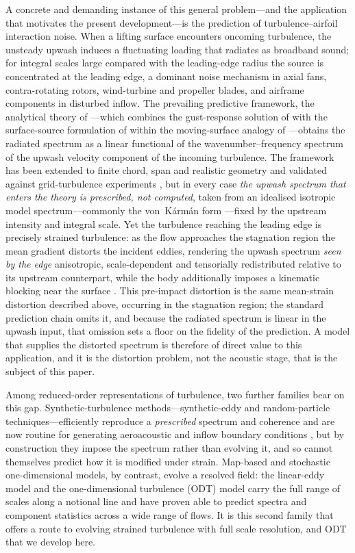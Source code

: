 \documentclass[lineno]{JFM-FLM_Au}
\begin{document}
A concrete and demanding instance of this general problem---and the application
that motivates the present development---is the prediction of
turbulence--airfoil interaction noise. When a lifting surface encounters
oncoming turbulence, the unsteady upwash induces a fluctuating loading that
radiates as broadband sound; for integral scales large compared with the
leading-edge radius the source is concentrated at the leading edge, a dominant
noise mechanism in axial fans, contra-rotating rotors, wind-turbine and
propeller blades, and airframe components in disturbed inflow. The prevailing
predictive framework, the analytical theory of \citet{Amiet1975}---which
combines the gust-response solution of \citet{Sears1941} with the
surface-source formulation of \citet{Curle1955} within the moving-surface
analogy of \citet{FfowcsWilliams1969}---obtains the radiated spectrum as a
linear functional of the wavenumber--frequency spectrum of the upwash velocity
component of the incoming turbulence. The framework has been extended to finite
chord, span and realistic geometry and validated against grid-turbulence
experiments \citep{PatersonAmiet1977,RogerMoreau2010}, but in every case
\emph{the upwash spectrum that enters the theory is prescribed, not computed},
taken from an idealised isotropic model spectrum---commonly the
von~K\'arm\'an form \citep{vonKarman1948}---fixed by the upstream intensity and
integral scale. Yet the turbulence reaching the leading edge is precisely
strained turbulence: as the flow approaches the stagnation region the mean
gradient distorts the incident eddies, rendering the upwash spectrum
\emph{seen by the edge} anisotropic, scale-dependent and tensorially
redistributed relative to its upstream counterpart, while the body additionally
imposes a kinematic blocking near the surface \citep{HuntGraham1978}. This
pre-impact distortion is the same mean-strain distortion described above,
occurring in the stagnation region; the standard prediction chain omits it,
and because the radiated spectrum is linear in the upwash input, that omission
sets a floor on the fidelity of the prediction. A model that supplies the
distorted spectrum is therefore of direct value to this application, and it is
the distortion problem, not the acoustic stage, that is the subject of this
paper.

Among reduced-order representations of turbulence, two further families bear on
this gap. Synthetic-turbulence methods---synthetic-eddy and random-particle
techniques---efficiently reproduce a \emph{prescribed} spectrum and coherence
and are now routine for generating aeroacoustic and inflow boundary conditions
\citep{KimHaeri2015}, but by construction they impose the spectrum rather than
evolving it, and so cannot themselves predict how it is modified under strain.
Map-based and stochastic one-dimensional models, by contrast, evolve a
resolved field: the linear-eddy model \citep{Kerstein1991} and the
one-dimensional turbulence (ODT) model \citep{Kerstein1999} carry the full range
of scales along a notional line and have proven able to predict spectra and
component statistics across a wide range of flows. It is this second family that
offers a route to evolving strained turbulence with full scale resolution, and
ODT that we develop here.
\end{document}
